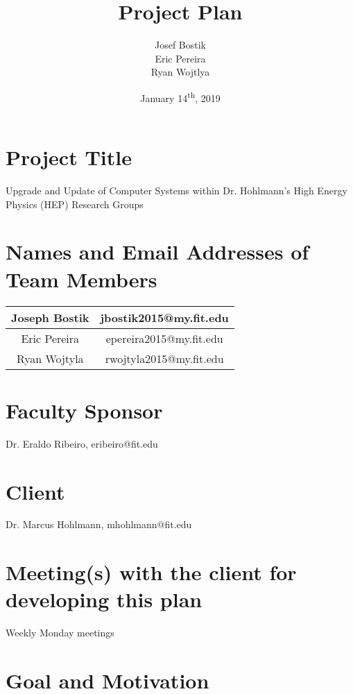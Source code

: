 \documentclass[12pt]{article}
\newcommand\tab[1][1cm]{\hspace*{#1}}
\begin{document}
\begin{titlepage}
	

\author{Josef Bostik\\
	Eric Pereira\\
	Ryan Wojtlya\\}
\date{January 14\textsuperscript{th}, 2019}
\title{Project Plan}
\maketitle
\end{titlepage}
\tableofcontents
\newpage
{}

\section{Project Title}
\tab Upgrade and Update of Computer Systems within Dr. Hohlmann's High Energy Physics (HEP) Research Groups
\section{Names and Email Addresses of Team Members}
\tab
\begin{tabular}{| c | c |}
	\hline
	Joseph Bostik & jbostik2015@my.fit.edu \\
	\hline
	Eric Pereira & epereira2015@my.fit.edu \\
	\hline
	Ryan Wojtyla & rwojtyla2015@my.fit.edu \\
	\hline
\end{tabular}

\section{Faculty Sponsor}
Dr. Eraldo Ribeiro, eribeiro@fit.edu

\section{Client}
Dr. Marcus Hohlmann, mhohlmann@fit.edu

\section{Meeting(s) with the client for developing this plan}
\tab Weekly Monday meetings

\section{Goal and Motivation}
\end{document}
